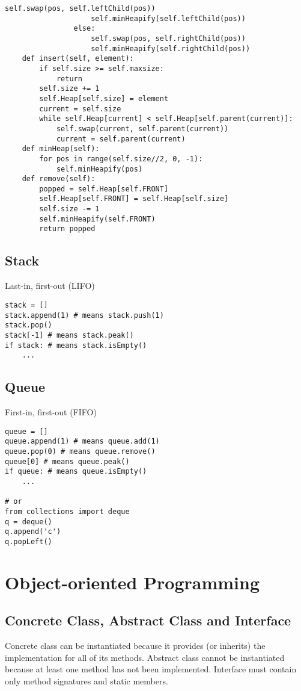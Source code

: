 \documentclass[a4paper, 11.25pt]{article}
\begin{document}
\begin{itemize}
\begin{lstlisting}[style=PythonStyle]
                    self.swap(pos, self.leftChild(pos))
                    self.minHeapify(self.leftChild(pos))
                else:
                    self.swap(pos, self.rightChild(pos))
                    self.minHeapify(self.rightChild(pos))
    def insert(self, element):
        if self.size >= self.maxsize:
            return
        self.size += 1
        self.Heap[self.size] = element
        current = self.size
        while self.Heap[current] < self.Heap[self.parent(current)]:
            self.swap(current, self.parent(current))
            current = self.parent(current)
    def minHeap(self):
        for pos in range(self.size//2, 0, -1):
            self.minHeapify(pos)
    def remove(self):
        popped = self.Heap[self.FRONT]
        self.Heap[self.FRONT] = self.Heap[self.size]
        self.size -= 1
        self.minHeapify(self.FRONT)
        return popped
\end{lstlisting}
\end{itemize}
\subsection{Stack}
Last-in, first-out (LIFO)
\begin{lstlisting}[style=PythonStyle]
stack = []
stack.append(1) # means stack.push(1)
stack.pop()
stack[-1] # means stack.peak()
if stack: # means stack.isEmpty()
    ...\end{lstlisting}

\subsection{Queue}
First-in, first-out (FIFO)
\begin{lstlisting}[style=PythonStyle]
queue = []
queue.append(1) # means queue.add(1)
queue.pop(0) # means queue.remove()
queue[0] # means queue.peak()
if queue: # means queue.isEmpty()
    ...

# or
from collections import deque
q = deque()
q.append('c')
q.popLeft()\end{lstlisting}

\clearpage
\section{Object-oriented Programming}
\subsection{Concrete Class, Abstract Class and Interface}
Concrete class can be instantiated because it provides (or inherits) the implementation for all of its methods. Abstract class cannot be instantiated because at least one method has not been implemented. Interface must contain only method signatures and static members.
\end{document}
